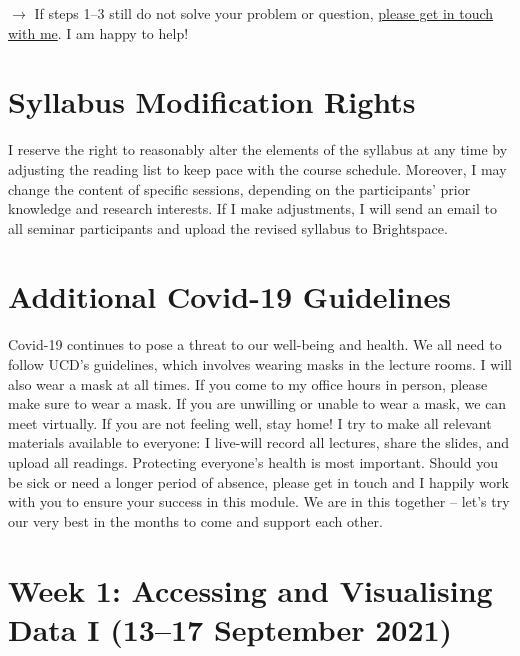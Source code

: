 \documentclass[abstract=on,parskip=full,headings=standardclasses,fontsize=11pt,paper=a4]{scrartcl}
\begin{document}
$\longrightarrow$ If steps 1--3 still do not solve your problem or question, \href{mailto:stefan.mueller@ucd.ie}{please get in touch with me}.  I am happy to help!




\section*{Syllabus Modification Rights}

I reserve the right to reasonably alter the elements of the syllabus at any time by adjusting the reading list to keep pace with the course schedule. Moreover, I may change the content of specific sessions, depending on the participants' prior knowledge and research interests. If I make adjustments, I will send an email to all seminar participants and upload the revised syllabus to Brightspace.



\section*{Additional Covid-19 Guidelines}


Covid-19 continues to pose a threat to our well-being and health. We all need to follow UCD's guidelines, which involves wearing masks in the lecture rooms. I will also wear  a mask at all times. If you come to my office hours in person, please make sure to wear a mask. If you are unwilling or unable to wear a mask, we can meet virtually. If you are not feeling well, stay home! I try to make all relevant materials available to everyone: I live-will record all lectures, share the slides, and upload all readings. Protecting everyone's health is most important. Should you be sick or need a longer period of absence, please get in touch  and I happily work with you to ensure your success in this module. We are in this together -- let's try our very best in the months to come and support each other.


\tableofcontents

\section{Week 1: Accessing and Visualising Data I (13--17 September 2021)}
\end{document}
